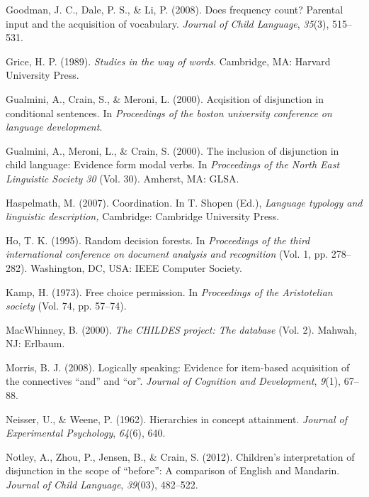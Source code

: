 \documentclass[floatsintext,man]{apa6}
\theoremstyle{definition}
\theoremstyle{definition}
\theoremstyle{definition}
\theoremstyle{remark}
\begin{document}
\hypertarget{ref-goodman2008does}{}
Goodman, J. C., Dale, P. S., \& Li, P. (2008). Does frequency count?
Parental input and the acquisition of vocabulary. \emph{Journal of Child
Language}, \emph{35}(3), 515--531.

\hypertarget{ref-grice1989studies}{}
Grice, H. P. (1989). \emph{Studies in the way of words}. Cambridge, MA:
Harvard University Press.

\hypertarget{ref-gualmini2000}{}
Gualmini, A., Crain, S., \& Meroni, L. (2000). Acqisition of disjunction
in conditional sentences. In \emph{Proceedings of the boston university
conference on language development}.

\hypertarget{ref-gualmini2000inclusion}{}
Gualmini, A., Meroni, L., \& Crain, S. (2000). The inclusion of
disjunction in child language: Evidence form modal verbs. In
\emph{Proceedings of the North East Linguistic Society 30} (Vol. 30).
Amherst, MA: GLSA.

\hypertarget{ref-haspelmath2007}{}
Haspelmath, M. (2007). Coordination. In T. Shopen (Ed.), \emph{Language
typology and linguistic description,} Cambridge: Cambridge University
Press.

\hypertarget{ref-ho1995random}{}
Ho, T. K. (1995). Random decision forests. In \emph{Proceedings of the
third international conference on document analysis and recognition}
(Vol. 1, pp. 278--282). Washington, DC, USA: IEEE Computer Society.

\hypertarget{ref-kamp1973free}{}
Kamp, H. (1973). Free choice permission. In \emph{Proceedings of the
Aristotelian society} (Vol. 74, pp. 57--74).

\hypertarget{ref-macwhinney2000childes}{}
MacWhinney, B. (2000). \emph{The CHILDES project: The database} (Vol.
2). Mahwah, NJ: Erlbaum.

\hypertarget{ref-morris2008logically}{}
Morris, B. J. (2008). Logically speaking: Evidence for item-based
acquisition of the connectives ``and'' and ``or''. \emph{Journal of
Cognition and Development}, \emph{9}(1), 67--88.

\hypertarget{ref-neisser1962hierarchies}{}
Neisser, U., \& Weene, P. (1962). Hierarchies in concept attainment.
\emph{Journal of Experimental Psychology}, \emph{64}(6), 640.

\hypertarget{ref-notley2012children}{}
Notley, A., Zhou, P., Jensen, B., \& Crain, S. (2012). Children's
interpretation of disjunction in the scope of ``before'': A comparison
of English and Mandarin. \emph{Journal of Child Language},
\emph{39}(03), 482--522.
\end{document}
